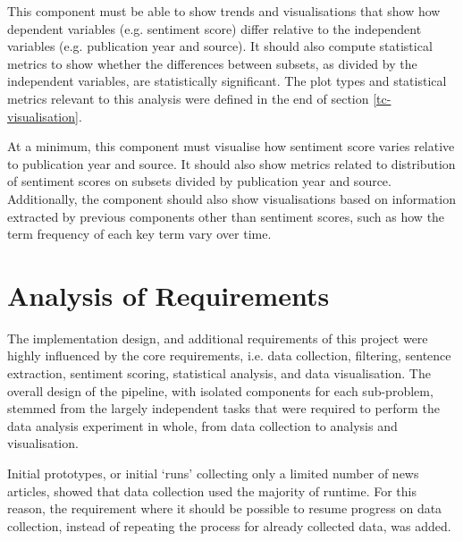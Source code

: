 \documentclass{report}
\begin{document}
This component must be able to show trends and visualisations that show how dependent variables (e.g. sentiment score) differ relative to the independent variables (e.g. publication year and source).
It should also compute statistical metrics to show whether the differences between subsets, as divided by the independent variables, are statistically significant.
The plot types and statistical metrics relevant to this analysis were defined in the end of section \ref{tc-visualisation}.

At a minimum, this component must visualise how sentiment score varies relative to publication year and source.
It should also show metrics related to distribution of sentiment scores on subsets divided by publication year and source.
Additionally, the component should also show visualisations based on information extracted by previous components other than sentiment scores, such as how the term frequency of each key term vary over time.


\section{Analysis of Requirements} \label{Analysis of Requirements}

The implementation design, and additional requirements of this project were highly influenced by the core requirements, i.e. data collection, filtering, sentence extraction, sentiment scoring, statistical analysis, and data visualisation.
The overall design of the pipeline, with isolated components for each sub-problem, stemmed from the largely independent tasks that were required to perform the data analysis experiment in whole, from data collection to analysis and visualisation.

Initial prototypes, or initial `runs' collecting only a limited number of news articles, showed that data collection used the majority of runtime.
For this reason, the requirement where it should be possible to resume progress on data collection, instead of repeating the process for already collected data, was added.
\end{document}

